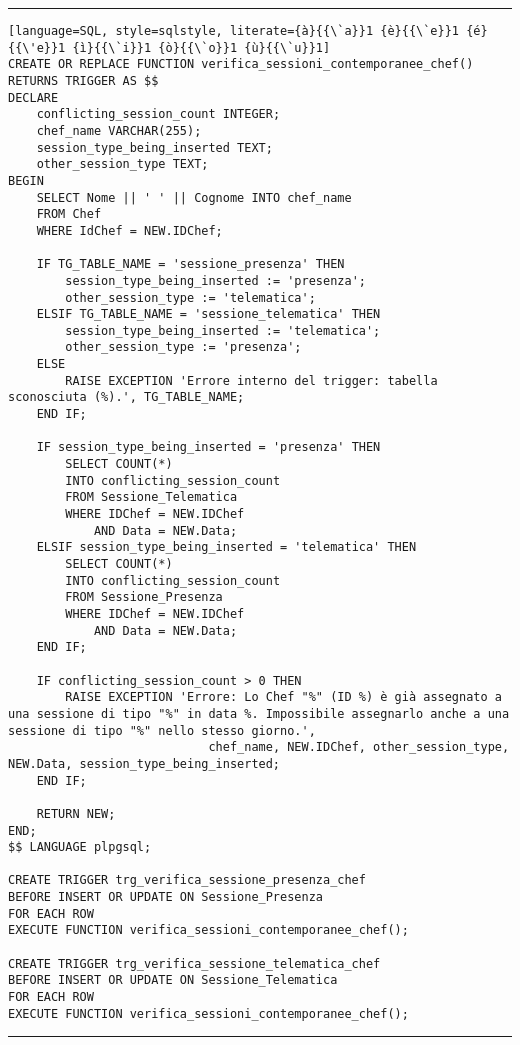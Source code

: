 \noindent\rule{\textwidth}{0.4pt}
\begin{lstlisting}[language=SQL, style=sqlstyle, literate={à}{{\`a}}1 {è}{{\`e}}1 {é}{{\'e}}1 {ì}{{\`i}}1 {ò}{{\`o}}1 {ù}{{\`u}}1]
CREATE OR REPLACE FUNCTION verifica_sessioni_contemporanee_chef()
RETURNS TRIGGER AS $$
DECLARE
    conflicting_session_count INTEGER;
    chef_name VARCHAR(255);
    session_type_being_inserted TEXT;
    other_session_type TEXT;
BEGIN
    SELECT Nome || ' ' || Cognome INTO chef_name
    FROM Chef
    WHERE IdChef = NEW.IDChef;

    IF TG_TABLE_NAME = 'sessione_presenza' THEN
        session_type_being_inserted := 'presenza';
        other_session_type := 'telematica';
    ELSIF TG_TABLE_NAME = 'sessione_telematica' THEN
        session_type_being_inserted := 'telematica';
        other_session_type := 'presenza';
    ELSE
        RAISE EXCEPTION 'Errore interno del trigger: tabella sconosciuta (%).', TG_TABLE_NAME;
    END IF;

    IF session_type_being_inserted = 'presenza' THEN
        SELECT COUNT(*)
        INTO conflicting_session_count
        FROM Sessione_Telematica
        WHERE IDChef = NEW.IDChef
            AND Data = NEW.Data;
    ELSIF session_type_being_inserted = 'telematica' THEN
        SELECT COUNT(*)
        INTO conflicting_session_count
        FROM Sessione_Presenza
        WHERE IDChef = NEW.IDChef
            AND Data = NEW.Data;
    END IF;

    IF conflicting_session_count > 0 THEN
        RAISE EXCEPTION 'Errore: Lo Chef "%" (ID %) è già assegnato a una sessione di tipo "%" in data %. Impossibile assegnarlo anche a una sessione di tipo "%" nello stesso giorno.',
                            chef_name, NEW.IDChef, other_session_type, NEW.Data, session_type_being_inserted;
    END IF;

    RETURN NEW;
END;
$$ LANGUAGE plpgsql;

CREATE TRIGGER trg_verifica_sessione_presenza_chef
BEFORE INSERT OR UPDATE ON Sessione_Presenza
FOR EACH ROW
EXECUTE FUNCTION verifica_sessioni_contemporanee_chef();

CREATE TRIGGER trg_verifica_sessione_telematica_chef
BEFORE INSERT OR UPDATE ON Sessione_Telematica
FOR EACH ROW
EXECUTE FUNCTION verifica_sessioni_contemporanee_chef();
\end{lstlisting}
\noindent\rule{\textwidth}{0.4pt}

